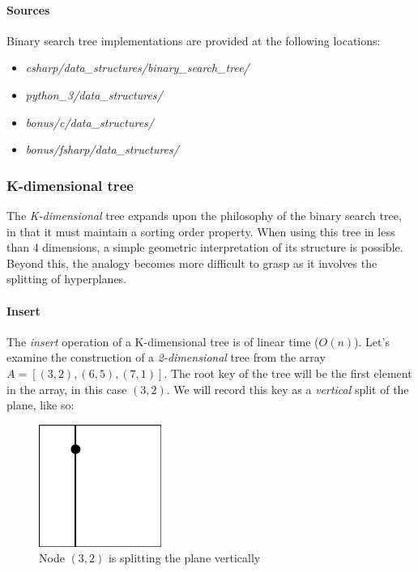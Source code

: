 \documentclass{article}
\begin{document}
\begin{samepage}
  \paragraph{Sources}
  Binary search tree implementations are provided at the following locations:
  \begin{itemize}
  \item{{\em csharp/data\_structures/binary\_search\_tree/}}
  \item{{\em python\_3/data\_structures/}}
  \item{{\em bonus/c/data\_structures/}}
  \item{{\em bonus/fsharp/data\_structures/}}
  \end{itemize}
\end{samepage}


\subsubsection{K-dimensional tree}
The {\em K-dimensional} tree expands upon the philosophy of the binary search tree, in that it
must maintain a sorting order property. When using this tree in less than 4 dimensions,
a simple geometric interpretation of its structure is possible. Beyond this, the analogy becomes
more difficult to grasp as it involves the splitting of hyperplanes.

\paragraph{Insert}
The {\em insert} operation of a K-dimensional tree is of linear time (\(O(n)\)).
Let's examine the construction of a {\em 2-dimensional} tree from the array \(A = [(3, 2), (6, 5), (7, 1)]\).
The root key of the tree will be the first element in the array, in this case \((3, 2)\).
We will record this key as a {\em vertical} split of the plane, like so:

\begin{figure}[H]
  \centering
  \includegraphics[width=4cm]{2d_tree_0}
  \caption{Node \((3, 2)\) is splitting the plane vertically}
\end{figure}
\end{document}
